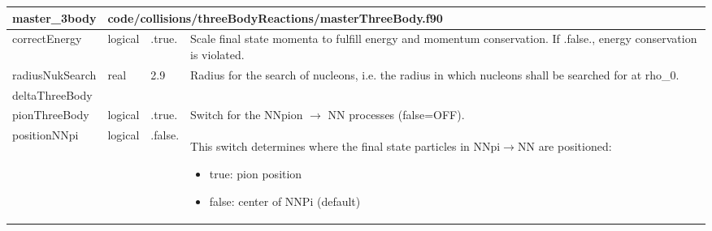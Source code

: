 \documentclass{article}
\begin{document}
\begin{longtable}{llll}
\toprule
\textbf{\large{master\_3body}} & \multicolumn{3}{l}{\footnotesize{code/collisions/threeBodyReactions/masterThreeBody.f90}}\\*
\midrule
\endfirsthead
\midrule
\endhead
correctEnergy & \begin{minipage}[t]{2cm}logical\end{minipage} & \begin{minipage}[t]{2cm}.true.\end{minipage} & \begin{minipage}[t]{12cm}Scale final state momenta to fulfill energy and momentum conservation. If .false., energy conservation is violated.\end{minipage}\\*
\midrule
radiusNukSearch & \begin{minipage}[t]{2cm}real\end{minipage} & \begin{minipage}[t]{2cm}2.9\end{minipage} & \begin{minipage}[t]{12cm}Radius for the search of nucleons, i.e. the radius in which nucleons shall be searched for at rho\_0.\end{minipage}\\*
\midrule
deltaThreeBody & \begin{minipage}[t]{2cm}\end{minipage} & \begin{minipage}[t]{2cm}\end{minipage} & \begin{minipage}[t]{12cm}\end{minipage}\\*
\midrule
pionThreeBody & \begin{minipage}[t]{2cm}logical\end{minipage} & \begin{minipage}[t]{2cm}.true.\end{minipage} & \begin{minipage}[t]{12cm}Switch for the NNpion $\rightarrow$ NN processes (false=OFF).\end{minipage}\\*
\midrule
positionNNpi & \begin{minipage}[t]{2cm}logical\end{minipage} & \begin{minipage}[t]{2cm}.false.\end{minipage} & \begin{minipage}[t]{12cm}This switch determines where the final state particles in NNpi$\rightarrow$NN are positioned:\begin{itemize}\leftmargin0em\itemindent0pt\item true: pion position\item false: center of NNPi (default)\end{itemize}\end{minipage}\\*
\bottomrule
\end{longtable}
{ }
\end{document}
